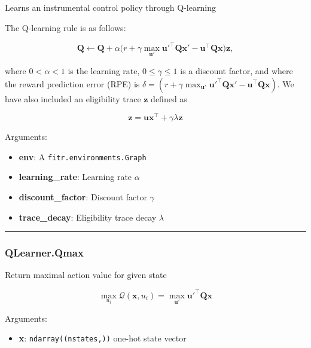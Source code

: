 Learns an instrumental control policy through Q-learning

The Q-learning rule is as follows:

\[
\mathbf Q \gets \mathbf Q + \alpha \big(r + \gamma \max_{\mathbf u'} \mathbf u'^\top \mathbf Q \mathbf x' - \mathbf u^\top \mathbf Q \mathbf x \big) \mathbf z,
\]

where \(0 < \alpha < 1\) is the learning rate, \(0 \leq \gamma \leq 1\)
is a discount factor, and where the reward prediction error (RPE) is
\(\delta = (r + \gamma \max_{\mathbf u'} \mathbf u'^\top \mathbf Q \mathbf x' - \mathbf u^\top \mathbf Q \mathbf x)\).
We have also included an eligibility trace \(\mathbf z\) defined as

\[
\mathbf z = \mathbf u \mathbf x^\top +  \gamma \lambda \mathbf z
\]

Arguments:

\begin{itemize}
\tightlist
\item
  \textbf{env}: A \texttt{fitr.environments.Graph}
\item
  \textbf{learning\_rate}: Learning rate \(\alpha\)
\item
  \textbf{discount\_factor}: Discount factor \(\gamma\)
\item
  \textbf{trace\_decay}: Eligibility trace decay \(\lambda\)
\end{itemize}

\begin{center}\rule{0.5\linewidth}{\linethickness}\end{center}

\subsubsection{QLearner.Qmax}\label{qlearner.qmax}

\begin{Shaded}
\begin{Highlighting}[]
\end{Highlighting}
\end{Shaded}

Return maximal action value for given state

\[
\max_{u_i}\mathcal Q(\mathbf x, u_i) = \max_{\mathbf u'} \mathbf u'^\top \mathbf Q \mathbf x
\]

Arguments:

\begin{itemize}
\tightlist
\item
  \textbf{x}: \texttt{ndarray((nstates,))} one-hot state vector
\end{itemize}

